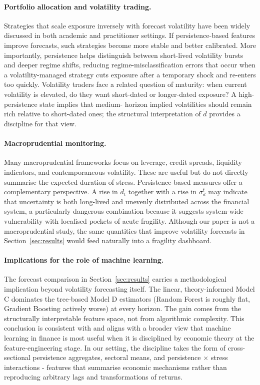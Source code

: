 \documentclass[11pt,a4paper]{article}
\newcommand{\dhat}{\hat d}
\begin{document}
\paragraph{Portfolio allocation and volatility trading.}
Strategies that scale exposure inversely with forecast volatility have
been widely discussed in both academic and practitioner settings. If
persistence-based features improve forecasts, such strategies become
more stable and better calibrated. More importantly, persistence helps
distinguish between short-lived volatility bursts and deeper regime
shifts, reducing regime-misclassification errors that occur when a
volatility-managed strategy cuts exposure after a temporary shock and
re-enters too quickly. Volatility traders face a related question of
maturity: when current volatility is elevated, do they want short-dated
or longer-dated exposure? A high-persistence state implies that medium-
horizon implied volatilities should remain rich relative to short-dated
ones; the structural interpretation of $\dhat$ provides a discipline
for that view.

\paragraph{Macroprudential monitoring.}
Many macroprudential frameworks focus on leverage, credit spreads,
liquidity indicators, and contemporaneous volatility. These are useful
but do not directly summarise the expected duration of stress.
Persistence-based measures offer a complementary perspective. A rise in
$\overline d_t$ together with a rise in $\sigma_d^t$ may indicate that
uncertainty is both long-lived and unevenly distributed across the
financial system, a particularly dangerous combination because it
suggests system-wide vulnerability with localised pockets of acute
fragility. Although our paper is not a macroprudential study, the same
quantities that improve volatility forecasts in
Section~\ref{sec:results} would feed naturally into a fragility
dashboard.

\paragraph{Implications for the role of machine learning.}
The forecast comparison in Section~\ref{sec:results} carries a
methodological implication beyond volatility forecasting itself. The
linear, theory-informed Model C dominates the tree-based Model D
estimators (Random Forest is roughly flat, Gradient Boosting actively
worse) at every horizon. The gain comes from the structurally
interpretable feature space, not from algorithmic complexity. This
conclusion is consistent with \citet{gu2020empirical} and aligns with a
broader view that machine learning in finance is most useful when it is
disciplined by economic theory at the feature-engineering stage. In our
setting, the discipline takes the form of cross-sectional persistence
aggregates, sectoral means, and persistence $\times$ stress
interactions - features that summarise economic mechanisms rather
than reproducing arbitrary lags and transformations of returns.
\end{document}
